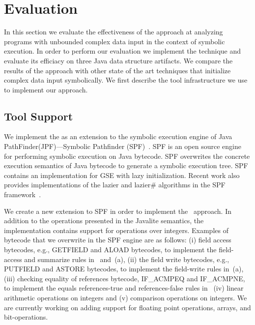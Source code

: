 

\section{Evaluation}
\label{sec:eval}
In this section we evaluate the effectiveness of the \symtxt{}
approach at analyzing programs with unbounded complex data input in
the context of symbolic execution. In order to perform our evaluation
we implement the \symtxt{} technique and evaluate its efficiacy on
three Java data structure artifacts. We compare the results of the
\symtxt{} approach with other state of the art techniques that
initialize complex data input symbolically. We first describe the tool
infrastructure we use to implement our approach.

\subsection{Tool Support}
We implement the \symtxt{} as an extension to the symbolic execution
engine of Java PathFinder(JPF)---Symbolic Pathfinder
(SPF)~\cite{visser:ase03,Pasareanu:ISSTA08,pasareanu:ase10,DBLP:journals/ase/PasareanuVBGMR13}. SPF
is an open source engine for performing symbolic execution on Java
bytecode. SPF overwrites the concrete execution semantics of Java
bytecode to generate a symbolic execution tree. SPF contains an
implementation for GSE with lazy initialization. Recent work also
provides implementations of the lazier and lazier\# algorithms in the
SPF framework~\cite{Hillery:2014}.


We create a new extension to SPF in order to implement the~\symtxt{}
approach. In addition to the operations presented in the Javalite
semantics, the implementation contains support for operations over
integers. Examples of bytecode that we overwrite in the SPF engine are
as follows: (i) field access bytecodes, e.g., GETFIELD and ALOAD
bytecodes, to implement the field-access and summarize rules
in~ and~(a), (ii) the field
write bytecodes, e.g., PUTFIELD and ASTORE bytecodes, to implement the
field-write rules in~(a), (iii) checking equality of
references bytecode, IF\_ACMPEQ and IF\_ACMPNE, to implement the
equals references-true and references-false rules in~
(iv) linear arithmetic operations on integers and (v) comparison
operations on integers. We are currently working on adding support for
floating point operations, arrays, and bit-operations.


